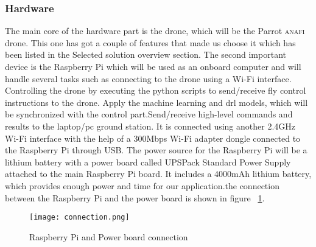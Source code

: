 \documentclass[../main.tex]{subfiles}
\begin{document}
\subsubsection{Hardware}
The main core of the hardware part is the drone, which will be the Parrot \textsc{anafi} drone. This one has got a couple of features that made us choose it which has been listed in the Selected solution overview section. The second important device is the Raspberry Pi which will be used as an onboard computer and will handle several tasks such as connecting to the drone using a Wi-Fi interface. Controlling the drone by executing the python scripts to send/receive fly control instructions to the drone. Apply the machine learning and \gls{drl} models, which will be synchronized with the control part.Send/receive high-level commands and results to the laptop/pc ground station. It is connected using another 2.4GHz Wi-Fi interface with the help of a 300Mbps Wi-Fi adapter dongle connected to the Raspberry Pi through USB. The power source for the Raspberry Pi will be a lithium battery with a power board called UPSPack Standard Power Supply attached to the main Raspberry Pi board. It includes a 4000mAh lithium battery, which provides enough power and time for our application.the connection between the Raspberry Pi and the power board is shown in figure ~\ref{Fig3:connection}.
\begin{figure}[H]
	\centering
	\texttt{[image: connection.png]}
	\caption{Raspberry Pi and Power board connection}\label{Fig3:connection}
\end{figure}     
\end{document}
